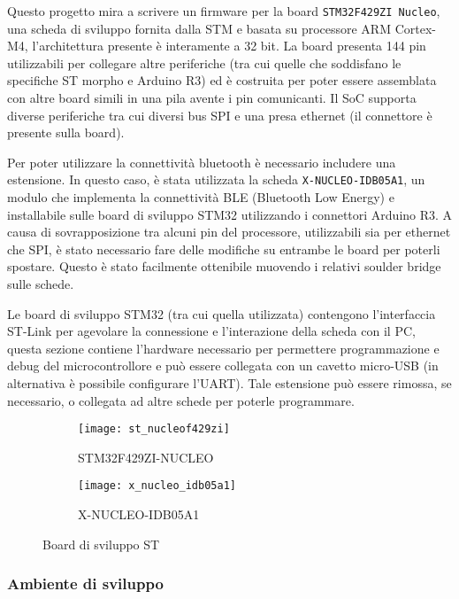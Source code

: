 
Questo progetto mira a scrivere un firmware per la board \texttt{STM32F429ZI Nucleo}, una scheda di sviluppo fornita dalla STM e basata su processore ARM Cortex-M4, l'architettura presente \`e interamente a 32 bit. La board presenta 144 pin utilizzabili per collegare altre periferiche (tra cui quelle che soddisfano le specifiche ST morpho e Arduino R3) ed \`e costruita per poter essere assemblata con altre board simili in una pila avente i pin comunicanti. Il SoC supporta diverse periferiche tra cui diversi bus SPI e una presa ethernet (il connettore \`e presente sulla board).

Per poter utilizzare la connettivit\`a bluetooth \`e necessario includere una estensione. In questo caso, \`e stata utilizzata la scheda \texttt{X-NUCLEO-IDB05A1}, un modulo che implementa la connettivit\`a BLE (Bluetooth Low Energy) e installabile sulle board di sviluppo STM32 utilizzando i connettori Arduino R3. A causa di sovrapposizione tra alcuni pin del processore, utilizzabili sia per ethernet che SPI, \`e stato necessario fare delle modifiche su entrambe le board per poterli spostare. Questo \`e stato facilmente ottenibile muovendo i relativi soulder bridge sulle schede.

Le board di sviluppo STM32 (tra cui quella utilizzata) contengono l'interfaccia ST-Link per agevolare la connessione e l'interazione della scheda con il PC, questa sezione contiene l'hardware necessario per permettere programmazione e debug del microcontrollore e pu\`o essere collegata con un cavetto micro-USB (in alternativa \`e possibile configurare l'UART). Tale estensione pu\`o essere rimossa, se necessario, o collegata ad altre schede per poterle programmare.

\begin{figure}[ht]
  \center
  \begin{subfigure}{.45\textwidth}
    \texttt{[image: st\_nucleof429zi]}
    \caption{STM32F429ZI-NUCLEO}
  \end{subfigure}
  \hfill
  \begin{subfigure}{.45\textwidth}
    \texttt{[image: x\_nucleo\_idb05a1]}
    \caption{X-NUCLEO-IDB05A1}
  \end{subfigure}
  \caption{Board di sviluppo ST}
  \label{fig:boards}
\end{figure}

\subsubsection{Ambiente di sviluppo}

